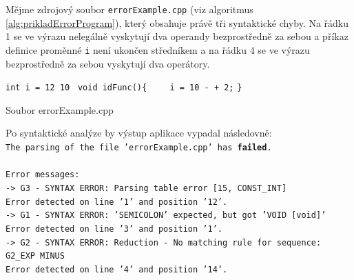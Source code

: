 \begin{priklad}
  Mějme zdrojový soubor \verb|errorExample.cpp| (viz algoritmus \ref{alg:prikladErrorProgram}), který obsahuje právě tři syntaktické chyby. Na řádku 1 se ve výrazu nelegálně vyskytují dva operandy
  bezprostředně za sebou a příkaz definice proměnné \verb|i| není ukončen středníkem a na řádku 4 se ve výrazu bezprostředně za sebou vyskytují dva operátory.

  \begin{algorithm} \label{alg:prikladErrorProgram}
    \DontPrintSemicolon
    \SetAlgoNoEnd


    \SetNlSty{}{}{:}
    \SetNlSkip{-1.1em}

    \Indp\Indpp
    \verb|int i = 12 10 | \;
    \;
    \verb|void idFunc(){|\;
    \verb|    i = 10 - + 2;|\;
    \verb|}|
    \caption{Soubor errorExample.cpp} \label{alg:prikladErrorProgram}
  \end{algorithm}

  \setlength{\defaultparindent}{\parindent}
  \setlength{\parindent}{0pt}

  \newpage
  Po syntaktické analýze by výstup aplikace vypadal následovně:\\

  \texttt{The parsing of the file 'errorExample.cpp' has \textbf{failed}.\\
  \  \\
  Error messages:\\
  \phantom{mm}-> G3 - SYNTAX ERROR: Parsing table error [15, CONST\_INT]\\
  \phantom{mmmmmm}Error detected on line '1' and position '12'.\\
  \phantom{mm}-> G1 - SYNTAX ERROR: 'SEMICOLON' expected, but got 'VOID [void]'\\
  \phantom{mmmmmm}Error detected on line '3' and position '1'.\\
  \phantom{mm}-> G2 - SYNTAX ERROR: Reduction - No matching rule for sequence:  G2\_EXP  MINUS\\
  \phantom{mmmmmm}Error detected on line '4' and position '14'.\\}

  \setlength{\parindent}{\defaultparindent}
\end{priklad}

